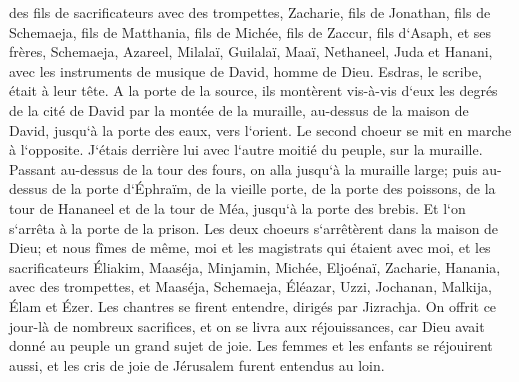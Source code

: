 \verse des fils de sacrificateurs avec des trompettes, Zacharie, fils de Jonathan, fils de Schemaeja, fils de Matthania, fils de Michée, fils de Zaccur, fils d`Asaph, 
\verse et ses frères, Schemaeja, Azareel, Milalaï, Guilalaï, Maaï, Nethaneel, Juda et Hanani, avec les instruments de musique de David, homme de Dieu. Esdras, le scribe, était à leur tête. 
\verse A la porte de la source, ils montèrent vis-à-vis d`eux les degrés de la cité de David par la montée de la muraille, au-dessus de la maison de David, jusqu`à la porte des eaux, vers l`orient. 
\verse Le second choeur se mit en marche à l`opposite. J`étais derrière lui avec l`autre moitié du peuple, sur la muraille. Passant au-dessus de la tour des fours, on alla jusqu`à la muraille large; 
\verse puis au-dessus de la porte d`Éphraïm, de la vieille porte, de la porte des poissons, de la tour de Hananeel et de la tour de Méa, jusqu`à la porte des brebis. Et l`on s`arrêta à la porte de la prison. 
\verse Les deux choeurs s`arrêtèrent dans la maison de Dieu; et nous fîmes de même, moi et les magistrats qui étaient avec moi, 
\verse et les sacrificateurs Éliakim, Maaséja, Minjamin, Michée, Eljoénaï, Zacharie, Hanania, avec des trompettes, 
\verse et Maaséja, Schemaeja, Éléazar, Uzzi, Jochanan, Malkija, Élam et Ézer. Les chantres se firent entendre, dirigés par Jizrachja. 
\verse On offrit ce jour-là de nombreux sacrifices, et on se livra aux réjouissances, car Dieu avait donné au peuple un grand sujet de joie. Les femmes et les enfants se réjouirent aussi, et les cris de joie de Jérusalem furent entendus au loin. 
